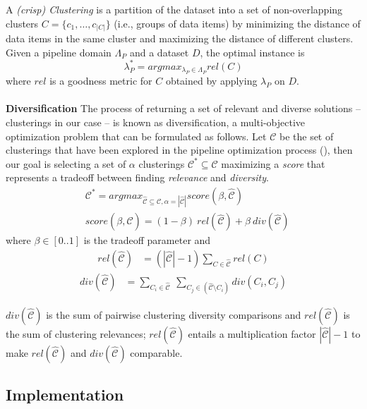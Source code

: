\documentclass[runningheads]{llncs}
\begin{document}
A \textit{(crisp) Clustering} is a partition of the dataset into a set of non-overlapping clusters  $C=\{c_1, \ldots, c_{|C|}\}$ (i.e., groups of data items) by minimizing the distance of data items in the same cluster and maximizing the distance of different clusters. 
Given a pipeline domain $\Lambda_P$ and a dataset $D$, the optimal instance is 
\begin{equation}
\label{eq:optimization}
    \lambda_P^* = argmax_{\lambda_P \in \Lambda_P} rel(C)
\end{equation}
where $rel$ is a goodness metric for $C$ obtained by applying $\lambda_P$ on $D$.
\\
\\
\textbf{Diversification} The process of returning a set of relevant and diverse solutions -- clusterings in our case -- is known as diversification, a multi-objective optimization problem that can be formulated as follows.
%
Let $\mathcal{C}$ be the set of clusterings that have been explored in the pipeline optimization process (), then our goal is selecting a set of $\alpha$ clusterings $\mathcal{C}^* \subseteq \mathcal{C}$ maximizing a \textit{score} that represents a tradeoff between finding \textit{relevance} and \textit{diversity}.
%
\begin{align}\label{def:score}
&\mathcal{C}^* = argmax_{\hat{\mathcal{C}} \subseteq \mathcal{C}, \alpha=|\hat{\mathcal{C}}|} score(\beta, \hat{\mathcal{C}})\\
&score(\beta, \hat{\mathcal{C}}) = (1-\beta)~rel(\hat{\mathcal{C}}) + \beta~div(\hat{\mathcal{C}})
\end{align}
where $\beta \in [0.. 1]$ is the tradeoff parameter and
\begin{align}
rel(\hat{\mathcal{C}}) &= (|\hat{\mathcal{C}}|-1)\sum_{C \in \hat{\mathcal{C}}} rel(C)
\label{def:rel}
\end{align}
\begin{align}
div(\hat{\mathcal{C}}) &= \sum_{C_i \in \hat{\mathcal{C}}}~\sum_{C_j \in (\hat{\mathcal{C}} \setminus C_i)} div(C_i, C_j)
\label{def:div}
\end{align}

\noindent $div(\hat{\mathcal{C}})$ is the sum of pairwise clustering diversity comparisons and $rel(\hat{\mathcal{C}})$ is the sum of clustering relevances;
$rel(\hat{\mathcal{C}})$ entails a multiplication factor $|\hat{\mathcal{C}}|-1$ to make $rel(\hat{\mathcal{C}})$ and $div(\hat{\mathcal{C}})$ comparable.

\subsection{Implementation}\label{sec:implementation}
\end{document}
